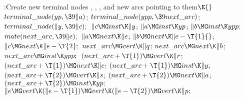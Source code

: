 \Y\B\4:Create new terminal nodes , , , and
new arcs pointing to them\X${}\E{}$\6
$\\{terminal\_node}(\\{yp},\39\|a){}$;\5
${}\\{terminal\_node}(\\{ypp},\39\\{next\_arc}){}$;\5
${}\\{terminal\_node}(\|y,\39\|c);{}$\6
${}\|c\MG\\{inst}\K\|y{}$;\5
${}\|a\MG\\{inst}\K\\{yp}{}$;\5
${}\|b\MG\\{inst}\K\\{ypp};{}$\6
${}\\{mate}(\\{next\_arc},\39\|e);{}$\6
${}\|a\MG\\{next}\K\|e{}$;\5
${}\|b\MG\\{next}\K\|e-\T{1}{}$;\5
${}\|c\MG\\{next}\K\|e-\T{2};{}$\6
${}\\{next\_arc}\MG\\{vert}\K\|q{}$;\5
${}\\{next\_arc}\MG\\{next}\K\|b{}$;\5
${}\\{next\_arc}\MG\\{inst}\K\\{ypp};{}$\6
${}(\\{next\_arc}+\T{1})\MG\\{vert}\K\|r{}$;\5
${}(\\{next\_arc}+\T{1})\MG\\{next}\K\|c{}$;\5
${}(\\{next\_arc}+\T{1})\MG\\{inst}\K\|y;{}$\6
${}(\\{next\_arc}+\T{2})\MG\\{vert}\K\|s{}$;\5
${}(\\{next\_arc}+\T{2})\MG\\{next}\K\|a{}$;\5
${}(\\{next\_arc}+\T{2})\MG\\{inst}\K\\{yp};{}$\6
${}\|e\MG\\{vert}\K(\|e-\T{1})\MG\\{vert}\K(\|e-\T{2})\MG\\{vert}\K\|p;{}$\6
